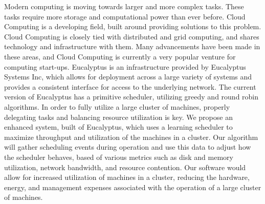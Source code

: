   Modern computing is moving towards larger and more complex tasks.  These tasks require more storage and computational power than ever before.  Cloud Computing is a developing field, built around providing solutions to this problem.  Cloud Computing is closely tied with distributed and grid computing, and shares technology and infrastructure with them.  Many advancements have been made in these areas, and Cloud Computing is currently a very popular venture for computing start-ups.  
  Eucalyptus is an infrastructure provided by Eucalyptus Systems Inc, which allows for deployment across a large variety of systems and provides a consistent interface for access to the underlying network.  The current version of Eucalyptus has a primitive scheduler, utilizing greedy and round robin algorithms.  In order to fully utilize a large cluster of machines, properly delegating tasks and balancing resource utilization is key.  
  We propose an enhanced system, built of Eucalyptus, which uses a learning scheduler to maximize throughput and utilization of the machines in a cluster.  Our algorithm will gather scheduling events during operation and use this data to adjust how the scheduler behaves, based of various metrics such as disk and memory utilization, network bandwidth, and resource contention.  Our software would allow for increased utilization of machines in a cluster, reducing the hardware, energy, and management expenses associated with the operation of a large cluster of machines.